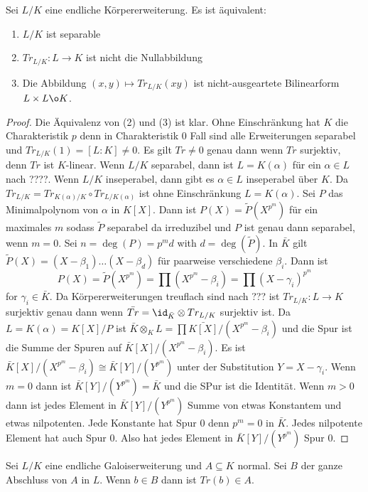\begin{Satz}
	Sei \(L/K\) eine endliche Körpererweiterung. Es ist äquivalent:
	\begin{enumerate}
		\item \(L/K\) ist separable
		\item \(Tr_{L/K}\colon L\to K\) ist nicht die Nullabbildung
		\item Die Abbildung \((x,y)\mapsto Tr_{L/K}(xy)\) ist nicht-ausgeartete Bilinearform \(L\times L\o K\).
	\end{enumerate}
\end{Satz}
\begin{proof}
	Die Äquivalenz von (2) und (3) ist klar.
	Ohne Einschränkung hat \(K\) die Charakteristik \(p\) denn in Charakteristik \(0\) Fall sind alle
	Erweiterungen separabel und \(Tr_{L/K}(1)=[L:K]\neq 0\).
	Es gilt \(Tr\neq 0\) genau dann wenn \(Tr\) surjektiv, denn \(Tr\) ist \(K\)-linear.
	Wenn \(L/K\) separabel, dann ist \(L=K(\alpha)\) für ein \(\alpha\in L\) nach ????.
	Wenn \(L/K\) inseperabel, dann gibt es \(\alpha\in L\) inseperabel über \(K\).
	Da \(Tr_{L/K}=Tr_{K(\alpha)/K}\circ Tr_{L/K(\alpha)}\) ist ohne Einschränkung \(L=K(\alpha)\).
	Sei \(P\) das Minimalpolynom von \(\alpha\) in \(K[X]\).
	Dann ist \(P(X)=\tilde P(X^{p^m})\) für ein maximales \(m\) sodass \(\tilde P\) separabel da irreduzibel und 
	\(P\) ist genau dann separabel, wenn \(m=0\).
	Sei \(n=\deg(P)=p^md\) with \(d=\deg(\tilde P)\).
	In \(\bar K\) gilt \(\tilde P(X)=(X-\beta_1)\dots (X-\beta_d)\) für paarweise verschiedene 
	\(\beta_i\). 
	Dann ist 
	\[P(X)=\tilde P(X^{p^m})=\prod (X^{p^m}-\beta_i)=\prod (X-\gamma_i)^{p^m}\]
	for \(\gamma_i\in\bar K\).
	Da Körpererweiterungen treuflach sind nach ??? ist \(Tr_{L/K}\colon L\to K\) surjektiv genau dann wenn 
	\(\bar{Tr}=\id_{\bar K}\otimes Tr_{L/K}\) surjektiv ist.
	Da \(L=K(\alpha)=K[X]/P\) ist \(\bar K\otimes_KL=\prod \bar{K[X]}/(X^{p^m}-\beta_i)\) und die Spur ist die Summe
	der Spuren auf \(\bar K[X]/(X^{p^m}-\beta_i)\).
	Es ist \(\bar K[X]/(X^{p^m}-\beta_i)\cong \bar K[Y]/(Y^{p^m})\) unter der Substitution
	\(Y=X-\gamma_i\).
	Wenn \(m=0\) dann ist \(\bar K[Y]/(Y^{p^m})=\bar K\) und die SPur ist die Identität.
	Wenn \(m>0\) dann ist jedes Element in \(\bar K[Y]/(Y^{p^m})\) Summe von etwas Konstantem und etwas nilpotenten.
	Jede Konstante hat Spur \(0\) denn \(p^m=0\) in \(\bar K\).
	Jedes nilpotente Element hat auch Spur \(0\). Also hat jedes Element in \(\bar K[Y]/(Y^{p^m})\) Spur \(0\).
\end{proof}
\begin{Satz}
	Sei \(L/K\) eine endliche Galoiserweiterung und \(A\subseteq K\) normal.
	Sei \(B\) der ganze Abschluss von \(A\) in \(L\).
	Wenn \(b\in B\) dann ist \(Tr(b)\in A\).
\end{Satz}
